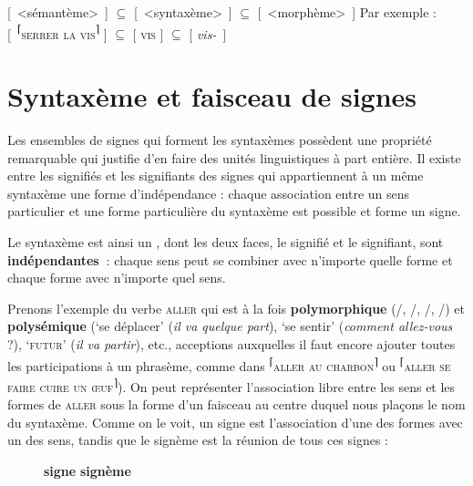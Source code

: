 {\ea{}
        [~<sémantème>~] \textrm{${\subseteq}$} [~<syntaxème>~] \textrm{${\subseteq}$} [~<morphème>~]
\z
    Par exemple :
\ea{}
        [~\textrm{\textsuperscript{⌈}}\textsc{serrer} \textsc{la} \textsc{vis}\textrm{\textsuperscript{⌉}} ] \textrm{${\subseteq}$} [ \textsc{vis} ] \textrm{${\subseteq}$} [ \textit{vis-}~]
\z
}
\section{Syntaxème et faisceau de signes}\label{sec:2.3.17}

Les ensembles de signes qui forment les syntaxèmes possèdent une propriété remarquable qui justifie d’en faire des unités linguistiques à part entière. Il existe entre les signifiés et les signifiants des signes qui appartiennent à un même syntaxème une forme d’indépendance : chaque association entre un sens particulier et une forme particulière du syntaxème est possible et forme un signe.

\begin{styleLivreImportant}
Le syntaxème est ainsi un , dont les deux faces, le signifié et le signifiant, sont \textbf{indépendantes~}: chaque sens peut se combiner avec n’importe quelle forme et chaque forme avec n’importe quel sens.
\end{styleLivreImportant}

Prenons l’exemple du verbe \textsc{aller} qui est à la fois \textbf{polymorphique} (/, /, /, /) et \textbf{polysémique} (‘se déplacer’ (\textit{il va quelque part}), ‘se sentir’ (\textit{comment allez-vous} ?), ‘\textsc{futur}’ (\textit{il va partir}), etc., acceptions auxquelles il faut encore ajouter toutes les participations à un phrasème, comme dans \textsuperscript{⌈}\textsc{aller} \textsc{au} \textsc{charbon}\textsuperscript{⌉} ou \textsuperscript{⌈}\textsc{aller} \textsc{se} \textsc{faire} \textsc{cuire} \textsc{un} \textsc{œuf}\textsuperscript{⌉}). On peut représenter l’association libre entre les sens et les formes de \textsc{aller} sous la forme d’un faisceau au centre duquel nous plaçons le nom du syntaxème. Comme on le voit, un signe est l’association d’une des formes avec un des sens, tandis que le signème est la réunion de tous ces signes :

\begin{figure}

      \textbf{signe}               \textbf{signème}

\caption{\label{fig:}}
\end{figure}

